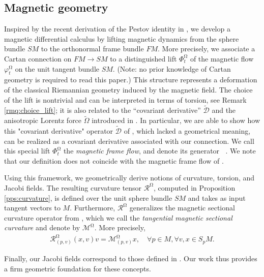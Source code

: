\documentclass[12pt]{amsart}
\numberwithin{numbering}{section}
\theoremstyle{plain}
\theoremstyle{definition}
\theoremstyle{remark}
\numberwithin{equation}{section}
\DeclareMathOperator{\xs}{\mathbb{X}^{\mg}}
\DeclareMathOperator{\mg}{\Omega}
\begin{document}
\subsection{Magnetic geometry}

Inspired by the recent derivation of the Pestov identity in \cite{cekic2025pestov}, we develop a magnetic differential calculus by lifting magnetic dynamics from the sphere bundle $SM$ to the orthonormal frame bundle $FM$. More precisely, we associate a Cartan connection on $FM \to SM$ to a distinguished lift $\Phi_t^{\mg}$ of the magnetic flow $\varphi_t^{\mg}$ on the unit tangent bundle $SM$. (Note: no prior knowledge of Cartan geometry is required to read this paper.) This structure represents a deformation of the classical Riemannian geometry induced by the magnetic field. The choice of the lift is nontrivial and can be interpreted in terms of torsion, see Remark \ref{rmq:choice_lift}; it is also related to the “covariant derivative” $\widetilde{\mathcal{D}}$ and the anisotropic Lorentz force $\widetilde{\Omega}$ introduced in \cite{assenza2025hopf}. In particular, we are able to show how this "covariant derivative" operator $\widetilde{\mathcal{D}}$ of \cite{assenza2025hopf}, which lacked a geometrical meaning, can be realized as a covariant derivative associated with our connection. We call this special lift $\Phi_t^{\mg}$ the \emph{magnetic frame flow}, and denote its generator $\xs$. We note that our definition does not coincide with the magnetic frame flow of \cite{reber2026finiteness}.

Using this framework, we geometrically derive notions of curvature, torsion, and Jacobi fields. The resulting curvature tensor $\mathcal{R}^{\mg}$, computed in Proposition \ref{pps:curvature}, is defined over the unit sphere bundle $SM$ and takes as input tangent vectors to $M$. Furthermore, $\mathcal{R}^{\mg}$ generalizes the magnetic sectional curvature operator from \cite{assenza2024magnetic}, which we call the \emph{tangential magnetic sectional curvature} and denote by $\mathcal{M}^{\mg}$. More precisely,
\begin{align*}
\mathcal{R}^{\mg}_{(p, v)}(x, v) v = \mathcal{M}^{\mg}_{(p, v)} x, \quad \forall p \in M, \forall v, x \in S_p M.
\end{align*}

Finally, our Jacobi fields correspond to those defined in \cite{assenza2025hopf}. Our work thus provides a firm geometric foundation for these concepts.

\medskip 
\end{document}
